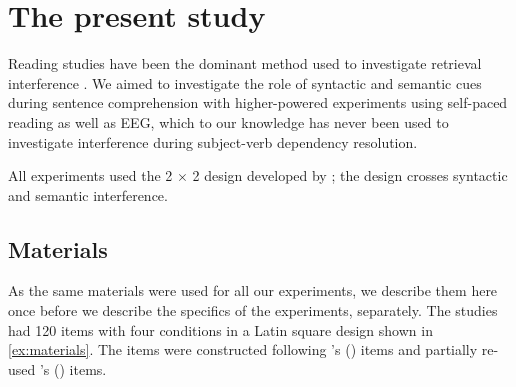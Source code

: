 \documentclass[a4paper, man, floatsintext]{apa7}
\begin{document}
\section{The present study}

Reading studies have been the dominant method used to investigate retrieval interference \parencite[see the review in][]{jaeger_etal_2017}.  We aimed to investigate the role of syntactic and semantic cues during sentence comprehension with higher-powered experiments using  self-paced reading as well as EEG, which to our knowledge has never been used to investigate interference during subject-verb dependency resolution.

All experiments used the 2 $\times$ 2 design developed by \textcite{vandyke07}; the design crosses syntactic and semantic interference. 

\subsection{Materials}

As the same materials were used for all our experiments, we describe them here once before we describe the specifics of the experiments, separately. The studies had 120 items with four conditions in a Latin square design shown in \ref{ex:materials}. The items were constructed following \citeauthor{vandyke07}'s (\citeyear{vandyke07}) items and partially re-used  \citeauthor{mertzen}'s (\citeyear{mertzen}) items.
\end{document}
